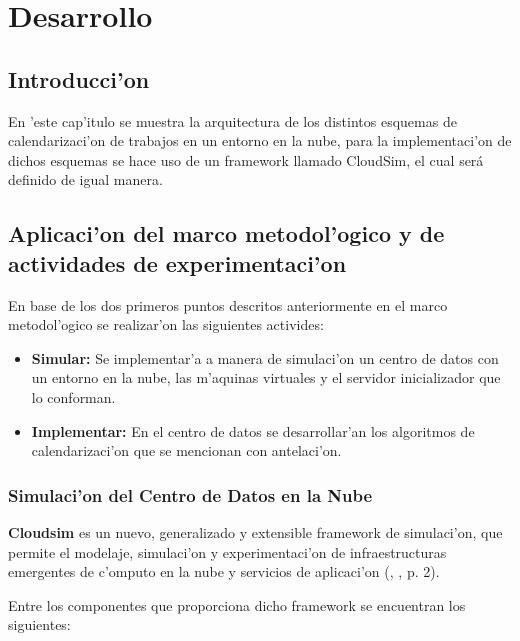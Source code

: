\chapter{Desarrollo}
\section*{Introducci'on}

En 'este cap'itulo se muestra la arquitectura de los distintos esquemas de calendarizaci'on de trabajos en un entorno en la nube, para la implementaci'on de dichos esquemas se hace uso de un framework llamado CloudSim, el cual será definido de igual manera.





\section{Aplicaci'on del marco metodol'ogico y de actividades de experimentaci'on}

En base de los dos primeros puntos descritos anteriormente en el marco metodol'ogico se realizar'on las siguientes activides:

\begin{itemize}
	\item \textbf{Simular:} Se implementar'a a manera de simulaci'on un centro de datos con un entorno en la nube, las m'aquinas virtuales y el servidor inicializador que lo conforman.
	\item \textbf{Implementar:} En el centro de datos se desarrollar'an los algoritmos de calendarizaci'on que se mencionan con antelaci'on.
\end{itemize}

\subsection{Simulaci'on del Centro de Datos en la Nube}

 \textbf{Cloudsim} es un nuevo, generalizado y extensible framework de simulaci'on, que permite el modelaje, simulaci'on y experimentaci'on de infraestructuras emergentes de c'omputo en la nube y servicios de aplicaci'on (\citeauthor{calheiros2011cloudsim}, \citeyear{calheiros2011cloudsim}, p. 2).

Entre los componentes que proporciona dicho framework se encuentran los siguientes:


